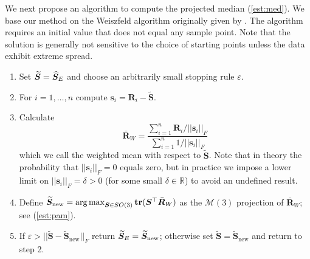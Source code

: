We next propose an algorithm to compute the projected median (\ref{est:med}).  We base our method on the Weiszfeld algorithm originally given by \cite{weiszfeld37}.  The algorithm requires an initial value that does not equal any sample point.   Note that the solution is generally not sensitive to the choice of starting points unless the data exhibit extreme spread.
\begin{enumerate}
\item Set $\widetilde{\bm S}={\widehat{\bm S}_E}$ and choose an arbitrarily small stopping rule $\varepsilon$.
\item For $i=1,\ldots,n$ compute $\bm s_i=\bm R_i-\widetilde{\bm S}$.
\item Calculate
\[
\bar{\bm R}_W=\frac{\sum_{i=1}^n\bm R_i/||\bm s_i||_F}{\sum_{i=1}^n1/||\bm s_i||_F}
\]
which we call the weighted mean with respect to $\widetilde{\bm S}$. Note that in theory the probability that $||\bm s_i||_F = 0$ equals zero, but in practice we impose a lower limit on $||\bm s_i||_F = \delta > 0$ (for some small $\delta \in \mathbb R$) to avoid an undefined result.
\item Define $\widetilde{\bm S}_{\text{new}} = \operatorname*{arg\,max}_{\bm{S}\in
SO(3)}{\mathbf{tr}}(\bm{S}^{\top}\bar{\bm{R}}_W)$ as the $\mathcal{M}(3)$ projection of $\bar{\bm R}_W$; see (\ref{est:pam}).
\item If $\varepsilon>||\widetilde{\bm S}-\widetilde{\bm S}_{\text{new}}||_F$ return ${\widetilde{\bm S}_E}=\widetilde{\bm S}_{\text{new}}$; otherwise set $\widetilde{\bm S}=\widetilde{\bm S}_{\text{new}}$ and return to step 2.
\end{enumerate}

